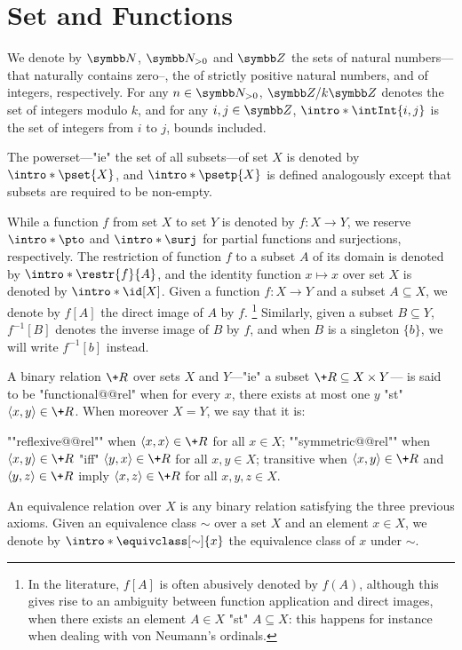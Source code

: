 \section{Set and Functions}

We denote by $\N$, $\Np$ and $\Z$ the sets of natural numbers---that naturally contains zero--, the
of strictly positive natural numbers, and of integers, respectively.
For any $n\in\Np$, $\ZnZ{k}$ denotes the set of integers modulo $k$,
and for any $i,j \in \Z$, $\intro*\intInt{i,j}$ is the set of integers from $i$ to $j$,
bounds included.

The powerset---"ie" the set of all subsets---of set $X$
is denoted by $\intro*\pset{X}$, and $\intro*\psetp{X}$ is defined analogously
except that subsets are required to be non-empty.

While a function $f$ from set $X$ to set $Y$ is denoted by $f\colon X \to Y$,
we reserve $\intro*\pto$ and $\intro*\surj$ for partial functions and surjections, respectively.
The restriction of function $f$ to a subset $A$ of its domain is denoted by
$\intro*\restr{f}{A}$, and the identity function $x \mapsto x$ over set $X$
is denoted by $\intro*\id[X]$.
Given a function $f\colon X \to Y$ and a subset $A \subseteq X$,
we denote by $f[A]$ the direct image of $A$ by $f$.%
\footnote{In the literature, $f[A]$ is often abusively denoted by $f(A)$, although
this gives rise to an ambiguity between function application and direct images,
when there exists an element $A \in X$ "st" $A \subseteq X$: this happens for instance
when dealing with von Neumann's ordinals.}
Similarly, given a subset $B \subseteq Y$, $f^{-1}[B]$ denotes
the inverse image of $B$ by $f$, and when $B$ is a singleton $\{b\}$,
we will write $f^{-1}[b]$ instead.%

A binary relation $\+R$ over sets $X$ and $Y$---"ie" a subset $\+R \subseteq X \times Y$---
is said to be "functional@@rel" when for every $x$, there exists at most one $y$
"st" $\tup{x,y} \in \+R$.
When moreover $X = Y$, we say that it is:
\begin{itemize}
	\itemAP ""reflexive@@rel"" when $\tup{x,x} \in \+R$ for all $x \in X$;
	\itemAP ""symmetric@@rel"" when $\tup{x,y} \in \+R$ "iff" $\tup{y,x} \in \+R$
		for all $x,y \in X$;
	\itemAP transitive when $\tup{x,y} \in \+R$ and $\tup{y,z} \in \+R$
		imply $\tup{x,z} \in \+R$
		for all $x,y,z \in X$.
\end{itemize}
An equivalence relation over $X$ is any binary relation satisfying the three previous axioms.
Given an equivalence class $\sim$ over a set $X$ and an element $x \in X$,
we denote by $\intro*\equivclass[\sim]{x}$ the equivalence class of $x$ under $\sim$.


